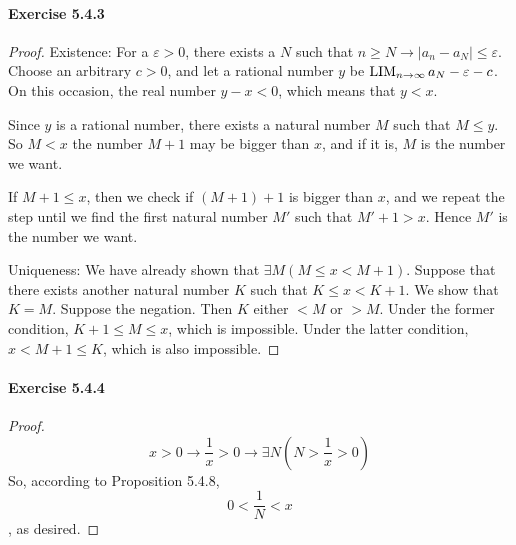 \paragraph{Exercise 5.4.3} \label{exercise5.4.3}
\begin{proof}
Existence:
For a $\varepsilon>0$, there exists a $N$ such that $n\geq N \longrightarrow |a_n-a_N| \leq \varepsilon$. Choose an 
arbitrary $c>0$, and let a rational number $y$ be $\operatorname*{LIM}_{n \to \infty}{a_N-\varepsilon-c}$. On this occasion, the real number 
$y-x<0$, which means that $y<x$. 

Since $y$ is a rational number, there exists a natural number $M$ such that $M \leq y$. So $M<x$ the number $M+1$ may be 
bigger than $x$, and if it is, $M$ is the number we want.

If $M+1 \leq x$, then we check if $(M+1)+1$ is bigger than $x$, and we repeat the step until we find the first natural 
number $M'$ such that $M'+1>x$. Hence $M'$ is the number we want.

Uniqueness:
We have already shown that $\exists M(M\leq x<M+1)$.
Suppose that there exists another natural number $K$ such that $K\leq x<K+1$. We show that $K=M$. Suppose the negation. 
Then $K$ either $<M$ or $>M$. Under the former condition, $K+1\leq M\leq x$, which is impossible. Under the latter 
condition, $x<M+1\leq K$, which is also impossible.
\end{proof}

\paragraph{Exercise 5.4.4} \label{exercise5.4.4}
\begin{proof}
\[
x>0\rightarrow \frac{1}{x}>0\rightarrow \exists N(N>\frac{1}{x}>0)
\]
So, according to Proposition 5.4.8,
\[
0<\frac{1}{N}<x
\]
, as desired.
\end{proof}

